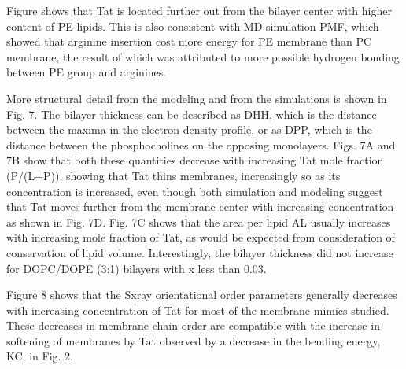 \documentclass[12pt,letterpaper]{article}
\begin{document}
Figure shows that Tat is located further out from the bilayer center with 
higher content of PE lipids. This is also consistent with MD simulation PMF,
which showed that arginine insertion cost more energy for PE membrane than
PC membrane, the result of which was attributed to more possible hydrogen 
bonding between PE group and arginines.



More structural detail from the modeling and from the simulations is shown in 
Fig. 7. The bilayer thickness can be described as DHH, which is the 
distance between the maxima in the electron density profile, or as DPP, which 
is the distance between the phosphocholines on the opposing monolayers. Figs. 
7A and 7B show that both these quantities decrease with increasing Tat mole 
fraction (P/(L+P)), showing that Tat thins membranes, increasingly so as its 
concentration is increased, even though both simulation and modeling suggest 
that Tat moves further from the membrane center with increasing concentration 
as shown in Fig. 7D.  Fig. 7C shows that the area per lipid AL usually increases 
with increasing mole fraction of Tat, as would be expected from consideration of 
conservation of lipid volume. Interestingly, the bilayer thickness did not 
increase for DOPC/DOPE (3:1) bilayers with x less than 0.03.  

Figure 8 shows that the Sxray orientational order parameters generally 
decreases with increasing concentration of Tat for most of the membrane mimics 
studied.  These decreases in membrane chain order are compatible with the 
increase in softening of membranes by Tat observed by a decrease in the bending
energy, KC, in Fig. 2.



\end{document}
